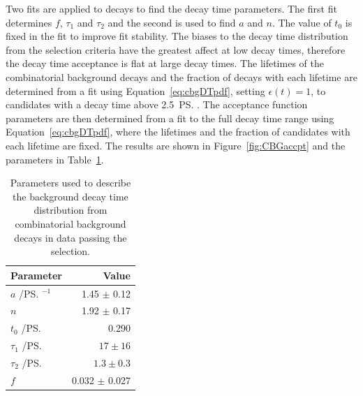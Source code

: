 {Two fits are applied to \bhh decays to find the decay time \pdf parameters. The first fit determines $f$, $\tau_1$ and $\tau_2$ and the second is used to find $a$ and $n$. The value of $t_0$ is fixed in the fit to improve fit stability.
The biases to the decay time distribution from the selection criteria have the greatest affect at low decay times, therefore the decay time acceptance is flat at large decay times. The lifetimes of the combinatorial background decays and the fraction of decays with each lifetime are determined from a fit using Equation~\ref{eq:cbgDTpdf}, setting $\epsilon(t)=1$, to candidates with a decay time above 2.5~\ps. The acceptance function parameters are then determined from a fit to the full decay time range using Equation~\ref{eq:cbgDTpdf}, where the lifetimes and the fraction of candidates with each lifetime are fixed. The results are shown in Figure~\ref{fig:CBGaccpt} and the \pdf parameters in Table~\ref{tab:bkgparams}. %
\begin{table}[tbp]
\begin{center}
\begin{tabular}{lr}
\toprule \toprule
Parameter & Value \\
\midrule
$a$ /\ps$^{-1}$ & 1.45 $\pm$ 0.12\\
$n$ & 1.92 $\pm$ 0.17 \\
$t_{0}$ /\ps & 0.290 \\
$\tau_{1}$ /\ps & $17 \pm 16$  \\ 
$\tau_{2}$ /\ps & $1.3 \pm 0.3$ \\
$f$ & 0.032 $\pm$ 0.027 \\
\bottomrule \bottomrule
\end{tabular}
\vspace{0.7cm}             
\caption{Parameters used to describe the background decay time distribution from combinatorial background decays in data passing the \bhh selection.}
\label{tab:bkgparams}
\end{center}
\vspace{-1.0cm}                                                                                                                                               
\end{table}

}
